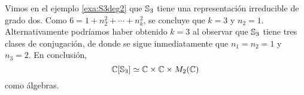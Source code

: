 \begin{example}
    Vimos en el ejemplo \ref{exa:S3deg2} 
    que $\mathbb{S}_3$ tiene una representación irreducible de grado dos. Como
    $6=1+n_2^2+\cdots+n_k^2$, se concluye que $k=3$ y $n_2=1$. Alternativamente podríamos haber
    obtenido $k=3$ al observar que $\mathbb{S}_3$ tiene tres clases de conjugación, de donde se sigue
    inmediatamente que $n_1=n_2=1$ y $n_3=2$. En conclusión, 
    \[
    \mathbb{C}[\mathbb{S}_3]\simeq \mathbb{C}\times\mathbb{C}\times M_2(\mathbb{C})
    \]
    como álgebras. 
\end{example}




